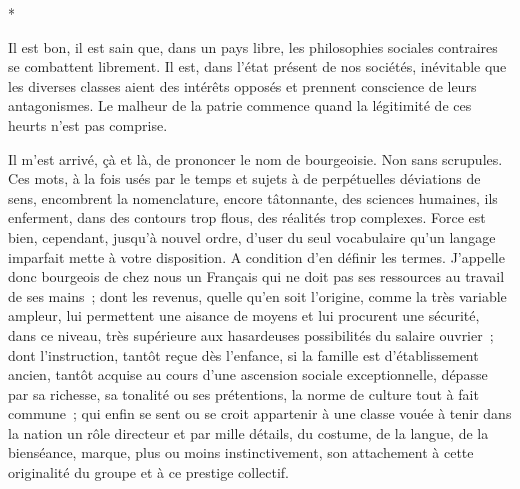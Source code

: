 \documentclass[french,twoside]{book} %
\begin{document}
\begin{center}
*\end{center}
\noindent Il est bon, il est sain que, dans un pays libre, les philosophies sociales contraires se combattent librement. Il est, dans l’état présent de nos sociétés, inévitable que les diverses classes aient des intérêts opposés et prennent conscience de leurs antagonismes. Le malheur de la patrie commence quand la légitimité de ces heurts n’est pas comprise.\par
Il m’est arrivé, çà et là, de prononcer le nom de bourgeoisie. Non sans scrupules. Ces mots, à la fois usés par le temps et sujets à de perpétuelles déviations de sens, encombrent la nomenclature, encore tâtonnante, des sciences humaines, ils enferment, dans des contours trop flous, des réalités trop complexes. Force est bien, cependant, jusqu’à nouvel ordre, d’user du seul vocabulaire qu’un langage imparfait mette à votre disposition. A condition d’en définir les termes. J’appelle donc bourgeois de chez nous un Français qui ne doit pas ses ressources au travail de ses mains ; dont les revenus, quelle qu’en soit l’origine, comme la très variable ampleur, lui permettent une aisance de moyens et lui procurent une sécurité, dans ce niveau, très supérieure aux hasardeuses possibilités du salaire ouvrier ; dont l’instruction, tantôt reçue dès l’enfance, si la famille est d’établissement ancien, tantôt acquise au cours d’une ascension sociale exceptionnelle, dépasse par sa richesse, sa tonalité ou ses prétentions, la norme   de culture tout à fait commune ; qui enfin se sent ou se croit appartenir à une classe vouée à tenir dans la nation un rôle directeur et par mille détails, du costume, de la langue, de la bienséance, marque, plus ou moins instinctivement, son attachement à cette originalité du groupe et à ce prestige collectif.\par
\end{document}
